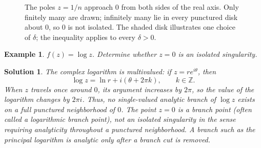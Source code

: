 \documentclass{report}
\newtheorem{example}{Example}
\newtheorem{solution}{Solution}
\begin{document}
\begin{figure}[H]
    \centering
    \caption{The poles $z=1/n$ approach $0$ from both sides of the real axis. Only finitely many are drawn; infinitely many lie in every punctured disk about $0$, so $0$ is not isolated. The shaded disk illustrates one choice of $\delta$; the inequality applies to every $\delta>0$.}
    \label{fig:accumulating-poles}
\end{figure}



\begin{example}
    $f(z)=\log z$. Determine whether $z=0$ is an isolated singularity.
\end{example}
\begin{solution}
    The complex logarithm is multivalued: if $z=re^{i\theta}$, then
    \[
        \log z=\ln r+i(\theta+2\pi k),\qquad k\in\mathbb{Z}.
    \]
    When $z$ travels once around $0$, its argument increases by $2\pi$,
    so the value of the logarithm changes by $2\pi i$. Thus, no
    single-valued analytic branch of $\log z$ exists on a full punctured
    neighborhood of $0$. The point $z=0$ is a branch point (often called a
    logarithmic branch point), not an isolated singularity in the sense
    requiring analyticity throughout a punctured neighborhood. A branch
    such as the principal logarithm is analytic only after a branch cut is
    removed.
\end{solution}
\end{document}
